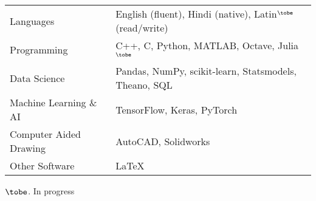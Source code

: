 

{\centering
\begin{tabular}{>{\raggedleft\arraybackslash}p{} p{}}
    
    Languages           &   English (fluent), Hindi (native), Latin$^\tobe$ (read/write)\B\\
    Programming         &   C++, C, Python, MATLAB, Octave, Julia$^\tobe$\T\B\\
    Data Science        &   Pandas, NumPy, scikit-learn, Statsmodels, Theano, SQL \T\\
    Machine Learning \& AI &   TensorFlow, Keras, PyTorch \T\\
    Computer Aided Drawing & AutoCAD, Solidworks\T\\
    Other Software      &   \LaTeX
\end{tabular}
}

\begin{flushleft}
    \small
    $\tobe$. In progress
\end{flushleft}%
